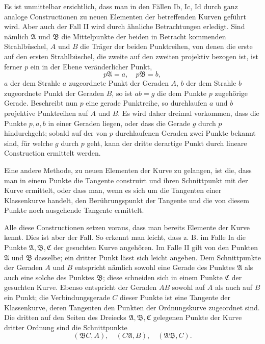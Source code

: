 \documentclass[11pt]{article}
\begin{document}
Es ist unmittelbar ersichtlich, dass man in den Fällen Ib, Ic, Id durch ganz analoge Constructionen zu neuen Elementen der betreffenden Kurven geführt wird. Aber auch der Fall II wird durch ähnliche Betrachtungen erledigt. Sind nämlich $\mathfrak A$ und $\mathfrak B$ die Mittelpunkte der beiden in Betracht kommenden Strahlbüschel, $A$ und $B$ die Träger der beiden Punktreihen, von denen die erste auf den ersten Strahlbüschel, die zweite auf den zweiten projektiv bezogen ist, ist ferner $p$ ein in der Ebene veränderlicher Punkt,
\[
p\mathfrak A=a,
\quad p\mathfrak B=b,
\]
$a$ der dem Strahle $a$ zugeordnete Punkt der Geraden $A$, $b$ der dem Strahle $b$ zugeordnete Punkt der Geraden $B$, so ist $ab=g$ die dem Punkte $p$ zugehörige Gerade. Beschreibt nun $p$ eine gerade Punktreihe, so durchlaufen $a$ und $b$ projektive Punktreihen auf $A$ und $B$. Es wird daher dreimal vorkommen, dass die Punkte $p,a,b$ in einer Geraden liegen, oder dass die Gerade $g$ durch $p$ hindurchgeht; sobald auf der von $p$ durchlaufenen Geraden zwei Punkte bekannt sind, für welche $g$ durch $p$ geht, kann der dritte derartige Punkt durch lineare Construction ermittelt werden.

Eine andere Methode, zu neuen Elementen der Kurve zu gelangen, ist die, dass man in einem Punkte die Tangente construirt und ihren Schnittpunkt mit der Kurve ermittelt, oder dass man, wenn es sich um die Tangenten einer Klassenkurve handelt, den Berührungspunkt der Tangente und die von diesem Punkte noch ausgehende Tangente ermittelt.

Alle diese Constructionen setzen voraus, dass man bereits Elemente der Kurve kennt. Dies ist aber der Fall. So erkennt man leicht, dass z. B. im Falle Ia die Punkte $\mathfrak A,\mathfrak B,\mathfrak C$ der gesuchten Kurve angehören. Im Falle II gilt von den Punkten $\mathfrak A$ und $\mathfrak B$ dasselbe; ein dritter Punkt lässt sich leicht angeben. Dem Schnittpunkte der Geraden $A$ und $B$ entspricht nämlich sowohl eine Gerade des Punktes $\mathfrak A$ als auch eine solche des Punktes $\mathfrak B$; diese schneiden sich in einem Punkte $\mathfrak C$ der gesuchten Kurve. Ebenso entspricht der Geraden $AB$ sowohl auf $A$ als auch auf $B$ ein Punkt; die Verbindungsgerade $C$ dieser Punkte ist eine Tangente der Klassenkurve, deren Tangenten den Punkten der Ordnungskurve zugeordnet sind. Die dritten auf den Seiten des Dreiecks $\mathfrak A,\mathfrak B,\mathfrak C$ gelegenen Punkte der Kurve dritter Ordnung sind die Schnittpunkte
\[
(\mathfrak B C,A),
\quad (C\mathfrak A,B),
\quad (\mathfrak A\mathfrak B,C).
\]
\end{document}
